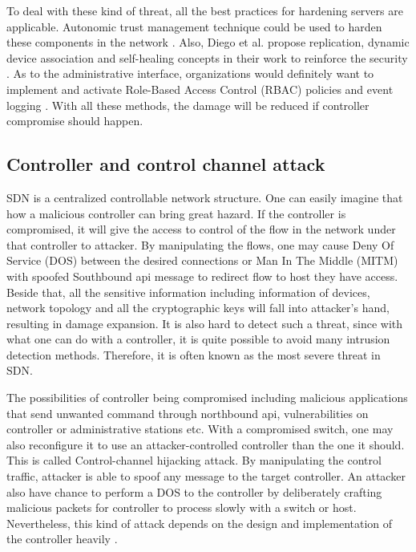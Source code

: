 To deal with these kind of threat, all the best practices for hardening servers are applicable. Autonomic trust management technique could be used to harden these components in the network \cite{YZP11}. Also, Diego et al. propose replication, dynamic device association and self-healing concepts in their work to reinforce the security \cite{KDFRV13}. As to the administrative interface, organizations would definitely want to implement and activate Role-Based Access Control (RBAC) policies and event logging \cite{FFR09}. With all these methods, the damage will be reduced if controller compromise should happen.

\subsection{Controller and control channel attack}
SDN is a centralized controllable network structure. One can easily imagine that how a malicious controller can bring great hazard. If the controller is compromised, it will give the access to control of the flow in the network under that controller to attacker. By manipulating the flows, one may cause Deny Of Service (DOS) between the desired connections or Man In The Middle (MITM) with spoofed Southbound api message to redirect flow to host they have access. Beside that, all the sensitive information including information of devices, network topology and all the cryptographic keys will fall into attacker's hand, resulting in damage expansion. It is also hard to detect such a threat, since with what one can do with a controller, it is quite possible to avoid many intrusion detection methods. Therefore, it is often known as the most severe threat in SDN.

The possibilities of controller being compromised including malicious applications that send unwanted command through northbound api, vulnerabilities on controller or administrative stations etc. With a compromised switch, one may also reconfigure it to use an attacker-controlled controller than the one it should. This is called Control-channel hijacking attack. By manipulating the control traffic, attacker is able to spoof any message to the target controller. An attacker also have chance to perform a DOS to the controller by deliberately crafting malicious packets for controller to process slowly with a switch or host. Nevertheless, this kind of attack depends on the design and implementation of the controller heavily \cite{AAS14}.

